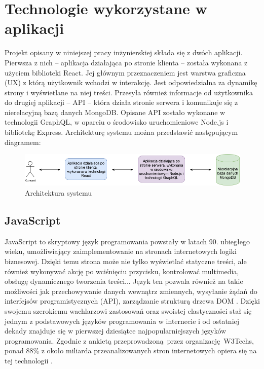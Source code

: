 \documentclass[12pt,twoside]{article}
\begin{document}
\clearpage

\section{Technologie wykorzystane w aplikacji}

Projekt opisany w niniejszej pracy inżynierskiej składa się z dwóch aplikacji. Pierwsza z nich -- aplikacja działająca po stronie klienta -- została wykonana z użyciem biblioteki React. Jej głównym przeznaczeniem jest warstwa graficzna (UX) z którą użytkownik wchodzi w interakcję. Jest odpowiedzialna za dynamikę strony i wyświetlane na niej treści. Przesyła również informacje od użytkownika do drugiej aplikacji -- API -- która działa stronie serwera i komunikuje się z nierelacyjną bazą danych MongoDB. Opisane API zostało wykonane w technologii GraphQL, w oparciu o środowisko uruchomieniowe Node.js i bibliotekę Express. Architekturę systemu można przedstawić następującym diagramem:

\begin{figure}[H]
	\centering
	\includegraphics[width=1\linewidth]{figures/app-architecture}
	\caption{Architektura systemu}
	\label{fig:system-architecture}
\end{figure}

\subsection{JavaScript}

JavaScript to skryptowy język programowania powstały w latach 90. ubiegłego wieku, umożliwiający zaimplementowanie na stronach internetowych logiki biznesowej. Dzięki temu strona może nie tylko wyświetlać statyczne treści, ale również wykonywać akcję po wciśnięciu przycisku, kontrolować multimedia, obsługę dynamicznego tworzenia treści... Język ten pozwala również na takie możliwości jak przechowywanie danych wewnątrz zmiennych, wysyłanie żądań do interfejsów programistycznych (API), zarządzanie strukturą drzewa DOM . Dzięki swojemu szerokiemu wachlarzowi zastosowań oraz swoistej elastyczności stał się jednym z podstawowych języków programowania w internecie i od ostatniej dekady znajduje się w pierwszej dziesiątce najpopularniejszych języków programowania. Zgodnie z ankietą przeprowadzoną przez organizację W3Techs, ponad 88\% z około miliarda przeanalizowanych stron internetowych opiera się na tej technologii \cite{JavascriptPopularity}. 
\end{document}
